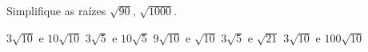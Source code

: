 Simplifique as raízes $\sqrt{90}$, $\sqrt{1000}$.

$3\sqrt{10}$ e $10\sqrt{10}$
$3\sqrt{5}$ e $10\sqrt{5}$
$9\sqrt{10}$ e $\sqrt{10}$
$3\sqrt{5}$ e $\sqrt{21}$
$3\sqrt{10}$ e $100\sqrt{10}$


